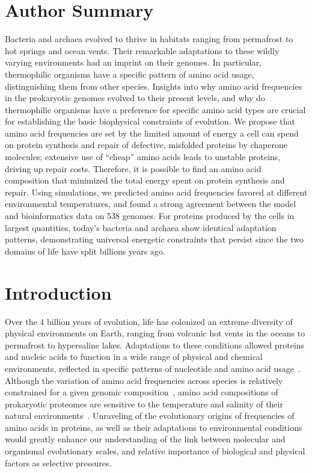 \documentclass[10pt,letterpaper]{article}
\begin{document}
\section*{Author Summary}

Bacteria and archaea evolved to thrive in habitats ranging from permafrost to hot springs and ocean vents. Their remarkable adaptations to these wildly varying environments had an imprint on their genomes. In particular, thermophilic organisms have a specific pattern of amino acid usage, distinguishing them from other species. Insights into why amino acid frequencies in the prokaryotic genomes evolved to their present levels, and why do thermophilic organisms have a preference for specific amino acid types are crucial for establishing the basic biophysical constraints of evolution. We propose that amino acid frequencies are set by the limited amount of energy a cell can spend on protein synthesis and repair of defective, misfolded proteins by chaperone molecules; extensive use of “cheap” amino acids leads to unstable proteins, driving up repair costs. 
Therefore, it is possible to find an amino acid composition that minimized the total energy spent on protein synthesis and repair. Using simulations, we predicted amino acid frequencies favored at different environmental temperatures, and found a strong agreement between the model and bioinformatics data on 538 genomes. For proteins produced by the cells in largest quantities, today’s bacteria and archaea show identical adaptation patterns, demonstrating universal energetic constraints that persist since the two domains of life have split billions years ago.

\section*{Introduction}

Over the 4 billion years of evolution, life has colonized an extreme diversity of physical environments on Earth, ranging from volcanic hot vents in the oceans to permafrost to hypersaline lakes. Adaptations to these conditions allowed proteins and nucleic acids to function in a wide range of physical and chemical environments, reflected in specific patterns of nucleotide and amino acid usage~\cite{Berezovsky2007Positive,Galtier1997Relationships,Zeldovich2007Protein,England2003Natural,Sghaier2013There,Fukuchi2003Unique,Sabath2013Growth}. Although the variation of amino acid frequencies across species is relatively constrained for a given genomic  composition~\cite{Krick2014Amino,Goncearenco2014Fundamental}, amino acid compositions of prokaryotic proteomes are sensitive to the temperature and salinity of their natural environments~\cite{Fukuchi2003Unique,Kreil2001Identification}. Unraveling of the evolutionary origins of frequencies of amino acids in proteins, as well as their adaptations to environmental conditions would greatly enhance our understanding of the link between molecular and organismal evolutionary scales, and relative importance of biological and physical factors as selective pressures.
\end{document}
